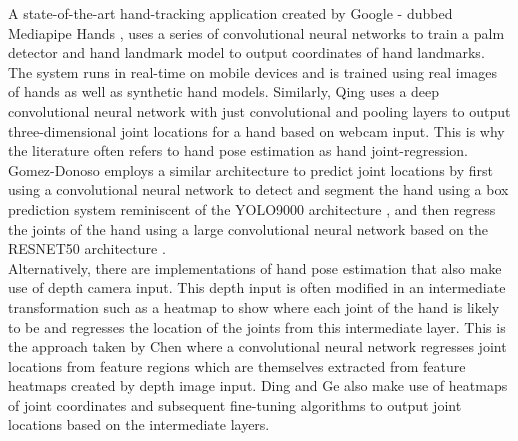 A state-of-the-art hand-tracking application created by Google - dubbed Mediapipe Hands \cite{mediapipe_hands}, uses a series of convolutional neural networks to train a palm detector and hand landmark model to output coordinates of hand landmarks. The system runs in real-time on mobile devices and is trained using real images of hands as well as synthetic hand models. Similarly, Qing \cite{deep_cnn} uses a deep convolutional neural network with just convolutional and pooling layers to output three-dimensional joint locations for a hand based on webcam input. This is why the literature often refers to hand pose estimation as hand joint-regression. Gomez-Donoso \cite{hand_pose_rgb_camera} employs a similar architecture to predict joint locations by first using a convolutional neural network to detect and segment the hand using a box prediction system reminiscent of the YOLO9000 architecture \cite{yolo_9000}, and then regress the joints of the hand using a large convolutional neural network based on the RESNET50 architecture \cite{resnet_50}.  \\

Alternatively, there are implementations of hand pose estimation that also make use of depth camera input. This depth input is often modified in an intermediate transformation such as a heatmap to show where each joint of the hand is likely to be and regresses the location of the joints from this intermediate layer. This is the approach taken by Chen \cite{pose_guided_cnn} where a convolutional neural network regresses joint locations from feature regions which are themselves extracted from feature heatmaps created by depth image input. Ding \cite{cnn_finetuning} and Ge \cite{depth_heatmaps} also make use of heatmaps of joint coordinates and subsequent fine-tuning algorithms to output joint locations based on the intermediate layers.  \\


